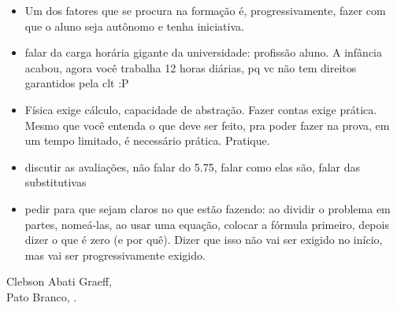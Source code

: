 \begin{itemize}
\item Um dos fatores que se procura na formação é, progressivamente, fazer com que o aluno seja autônomo e tenha iniciativa.

\item falar da carga horária gigante da universidade: profissão aluno. A infância acabou, agora você trabalha 12 horas diárias, pq vc não tem direitos garantidos pela clt :P

\item Física exige cálculo, capacidade de abstração. Fazer contas exige prática. Mesmo que você entenda o que deve ser feito, pra poder fazer na prova, em um tempo limitado, é necessário prática. Pratique.

\item discutir as avaliações, não falar do 5.75, falar como elas são, falar das substitutivas

\item pedir para que sejam claros no que estão fazendo: ao dividir o problema em partes, nomeá-las, ao usar uma equação, colocar a fórmula primeiro, depois dizer o que é zero (e por quê). Dizer que isso não vai ser exigido no início, mas vai ser progressivamente exigido.


\end{itemize}

\vspace{1cm}
\begin{flushright}
Clebson Abati Graeff,\\
Pato Branco, \monthyear.
\end{flushright}

